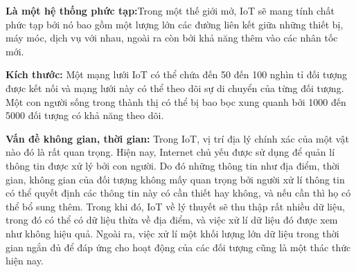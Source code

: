 \textbf{Là một hệ thống phức tạp:}Trong một thế giới mở, IoT sẽ mang tính chất phức tạp bởi nó bao gồm một lượng lớn các đường liên kết giữa những thiết bị, máy móc, dịch vụ với nhau, ngoài ra còn bởi khả năng thêm vào các nhân tốc mới.

\textbf{Kích thước: } Một mạng lưới IoT có thể chứa đến 50 đến 100 nghìn tỉ đối tượng được kết nối và mạng lưới này có thể theo dõi sự di chuyển của từng đối tượng. Một con người sống trong thành thị có thể bị bao bọc xung quanh bởi 1000 đến 5000 đối tượng có khả năng theo dõi.

\textbf{Vấn đề không gian, thời gian: }Trong IoT, vị trí địa lý chính xác của một vật nào đó là rất quan trọng. Hiện nay, Internet chủ yếu được sử dụng để quản lí thông tin được xử lý bởi con người. Do đó những thông tin như địa điểm, thời gian, không gian của đối tượng không mấy quan trọng bởi người xử lí thông tin có thể quyết định các thông tin này có cần thiết hay không, và nếu cần thì họ có thể bổ sung thêm. Trong khi đó, IoT về lý thuyết sẽ thu thập rất nhiều dữ liệu, trong đó có thể có dữ liệu thừa về địa điểm, và việc xử lí dữ liệu đó được xem như không hiệu quả. Ngoài ra, việc xử lí một khối lượng lớn dữ liệu trong thời gian ngắn đủ để đáp ứng cho hoạt động của các đối tượng cũng là một thác thức hiện nay.

\newpage

